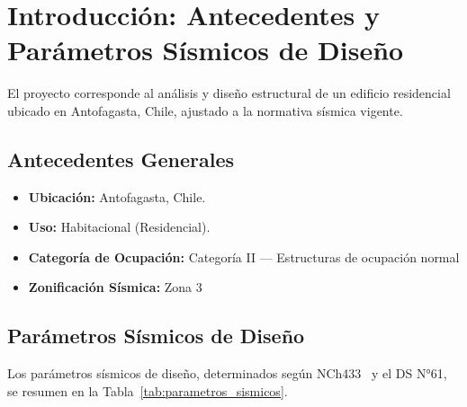 \section{Introducción: Antecedentes y Parámetros Sísmicos de Diseño}
\label{sec:intro}

El proyecto corresponde al análisis y diseño estructural de un edificio residencial 
ubicado en Antofagasta, Chile, ajustado a la normativa sísmica vigente.

\subsection{Antecedentes Generales}

\begin{itemize}
    \item \textbf{Ubicación:} Antofagasta, Chile.
    \item \textbf{Uso:} Habitacional (Residencial).
    \item \textbf{Categoría de Ocupación:} Categoría II --- Estructuras de ocupación 
          normal
    \item \textbf{Zonificación Sísmica:} Zona 3 
\end{itemize}

\subsection{Parámetros Sísmicos de Diseño}

Los parámetros sísmicos de diseño, determinados según NCh433~\cite{NCh433:1996} 
y el DS N°61, se resumen en la Tabla~\ref{tab:parametros_sismicos}.

